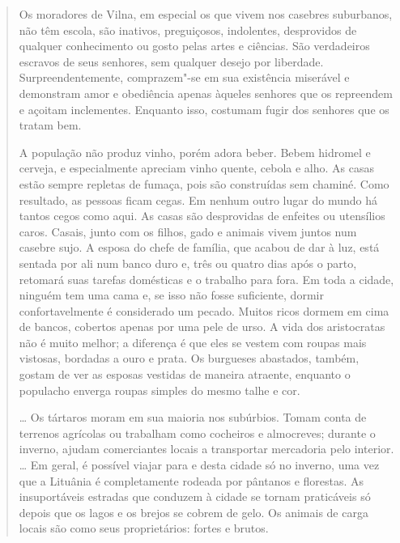 \begin{quote}
Os moradores de Vilna, em especial os que vivem nos casebres suburbanos,
não têm escola, são inativos, preguiçosos, indolentes, desprovidos de
qualquer conhecimento ou gosto pelas artes e ciências. São verdadeiros
escravos de seus senhores, sem qualquer desejo por liberdade.
Surpreendentemente, comprazem"-se em sua existência miserável e
demonstram amor e obediência apenas àqueles senhores que os repreendem e
açoitam inclementes. Enquanto isso, costumam fugir dos senhores que os
tratam bem.

A população não produz vinho, porém adora beber. Bebem hidromel e
cerveja, e especialmente apreciam vinho quente, cebola e alho. As casas
estão sempre repletas de fumaça, pois são construídas sem chaminé. Como
resultado, as pessoas ficam cegas. Em nenhum outro lugar do mundo há
tantos cegos como aqui. As casas são desprovidas de enfeites ou
utensílios caros. Casais, junto com os filhos, gado e animais vivem
juntos num casebre sujo. A esposa do chefe de família, que acabou de dar
à luz, está sentada por ali num banco duro e, três ou quatro dias após o
parto, retomará suas tarefas domésticas e o trabalho para fora. Em toda
a cidade, ninguém tem uma cama e, se isso não fosse suficiente, dormir
confortavelmente é considerado um pecado. Muitos ricos dormem em cima de
bancos, cobertos apenas por uma pele de urso. A vida dos aristocratas
não é muito melhor; a diferença é que eles se vestem com roupas mais
vistosas, bordadas a ouro e prata. Os burgueses abastados, também,
gostam de ver as esposas vestidas de maneira atraente, enquanto o
populacho enverga roupas simples do mesmo talhe e cor.

\ldots{} Os tártaros moram em sua maioria nos subúrbios. Tomam conta de
terrenos agrícolas ou trabalham como cocheiros e almocreves; durante o
inverno, ajudam comerciantes locais a transportar mercadoria pelo
interior. \ldots{} Em geral, é possível viajar para e desta cidade só no
inverno, uma vez que a Lituânia é completamente rodeada por pântanos e
florestas. As insuportáveis estradas que conduzem à cidade se tornam
praticáveis só depois que os lagos e os brejos se cobrem de gelo. Os
animais de carga locais são como seus proprietários: fortes e brutos.


\end{quote}
